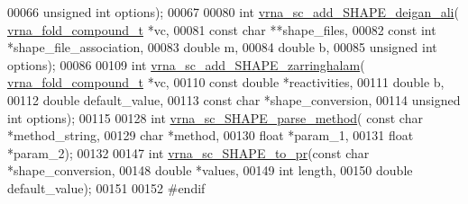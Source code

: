 \begin{DoxyCode}
00066                               \textcolor{keywordtype}{unsigned} \textcolor{keywordtype}{int} options);
00067 
00080 \textcolor{keywordtype}{int} \hyperlink{group__SHAPE__reactivities_ga04ba85da63d8c793bb8001d1e6f800ba}{vrna\_sc\_add\_SHAPE\_deigan\_ali}( 
      \hyperlink{group__fold__compound_structvrna__fc__s}{vrna\_fold\_compound\_t} *vc,
00081                                   \textcolor{keyword}{const} \textcolor{keywordtype}{char} **shape\_files,
00082                                   \textcolor{keyword}{const} \textcolor{keywordtype}{int} *shape\_file\_association,
00083                                   \textcolor{keywordtype}{double} m,
00084                                   \textcolor{keywordtype}{double} b,
00085                                   \textcolor{keywordtype}{unsigned} \textcolor{keywordtype}{int} options);
00086 
00109 \textcolor{keywordtype}{int} \hyperlink{group__SHAPE__reactivities_gaf3c65a045060aef5c4e41693d30af58c}{vrna\_sc\_add\_SHAPE\_zarringhalam}( 
      \hyperlink{group__fold__compound_structvrna__fc__s}{vrna\_fold\_compound\_t} *vc,
00110                                     \textcolor{keyword}{const} \textcolor{keywordtype}{double} *reactivities,
00111                                     \textcolor{keywordtype}{double} b,
00112                                     \textcolor{keywordtype}{double} default\_value,
00113                                     \textcolor{keyword}{const} \textcolor{keywordtype}{char} *shape\_conversion,
00114                                     \textcolor{keywordtype}{unsigned} \textcolor{keywordtype}{int} options);
00115 
00128 \textcolor{keywordtype}{int} \hyperlink{constraints__SHAPE_8h_a71b84eb0dd69e5c256f4ecf8f78cf314}{vrna\_sc\_SHAPE\_parse\_method}( \textcolor{keyword}{const} \textcolor{keywordtype}{char} *method\_string,
00129                                 \textcolor{keywordtype}{char} *method,
00130                                 \textcolor{keywordtype}{float} *param\_1,
00131                                 \textcolor{keywordtype}{float} *param\_2);
00132 
00147 \textcolor{keywordtype}{int} \hyperlink{group__SHAPE__reactivities_ga67675b3ed48744489a3bcfa4174197cb}{vrna\_sc\_SHAPE\_to\_pr}(\textcolor{keyword}{const} \textcolor{keywordtype}{char} *shape\_conversion,
00148                         \textcolor{keywordtype}{double} *values,
00149                         \textcolor{keywordtype}{int} length,
00150                         \textcolor{keywordtype}{double} default\_value);
00151 
00152 \textcolor{preprocessor}{#endif}
\end{DoxyCode}
